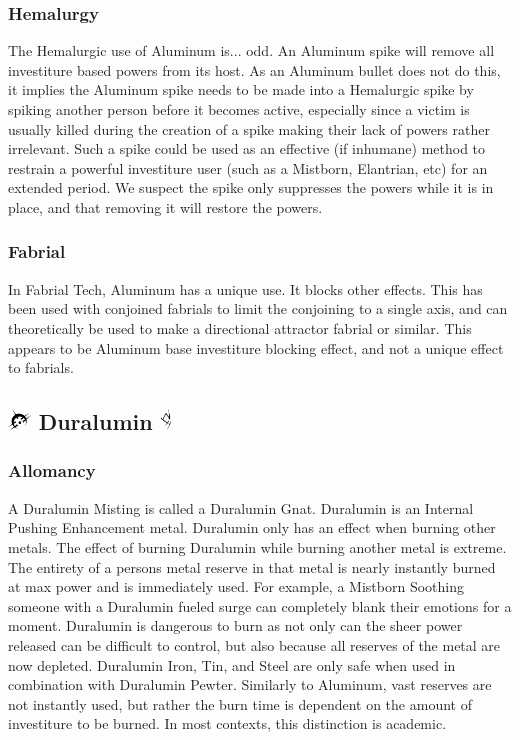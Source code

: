 \documentclass[conference]{IEEEtran}
\newcommand{\n}{\hfill\break}
\begin{document}
\subsubsection*{\textbf{Hemalurgy}}
The Hemalurgic use of Aluminum is... odd.  An Aluminum spike will remove all investiture based powers from its host.\cite{HE-TB}  As an Aluminum bullet does not do this, it implies the Aluminum spike needs to be made into a Hemalurgic spike by spiking another person before it becomes active, especially since a victim is usually killed during the creation of a spike making their lack of powers rather irrelevant.  Such a spike could be used as an effective (if inhumane) method to restrain a powerful investiture user (such as a Mistborn, Elantrian, etc) for an extended period.  We suspect the spike only suppresses the powers while it is in place, and that removing it will restore the powers.\\  
\subsubsection*{\textbf{Fabrial}}
In Fabrial Tech, Aluminum has a unique use.  It blocks other effects.  This has been used with conjoined fabrials to limit the conjoining to a single axis,\cite{RoW-CH19} and can theoretically be used to make a directional attractor fabrial or similar.  This appears to be Aluminum base investiture blocking effect, and not a unique effect to fabrials.
\n
\subsection*{\includegraphics[height=1em]{images/Duralumin.png}  \textbf{Duralumin} \includegraphics[height=1em]{images/Duralumin_(Feruchemy).png}}
\subsubsection*{\textbf{Allomancy}}
A Duralumin Misting is called a Duralumin Gnat.\cite{ARS}  Duralumin is an Internal Pushing Enhancement metal.\cite{AL-TB}  Duralumin only has an effect when burning other metals.  The effect of burning Duralumin while burning another metal is extreme. The entirety of a persons metal reserve in that metal is nearly instantly burned at max power and is immediately used.\cite{ARS}   For example, a Mistborn Soothing someone with a Duralumin fueled surge can completely blank their emotions for a moment.\cite{WoA-ch27}  Duralumin is dangerous to burn as not only can the sheer power released can be difficult to control,\cite{WoA-CH11} but also because all reserves of the metal are now depleted.\cite{WoA-CH38}  Duralumin Iron, Tin, and Steel are only safe when used in combination with Duralumin Pewter.\cite{WoA-CH11}  Similarly to Aluminum, vast reserves are not instantly used,\cite{slow-leech} but rather the burn time is dependent on the amount of investiture to be burned.\cite{TLM-CH71}  In most contexts, this distinction is academic.
\end{document}
